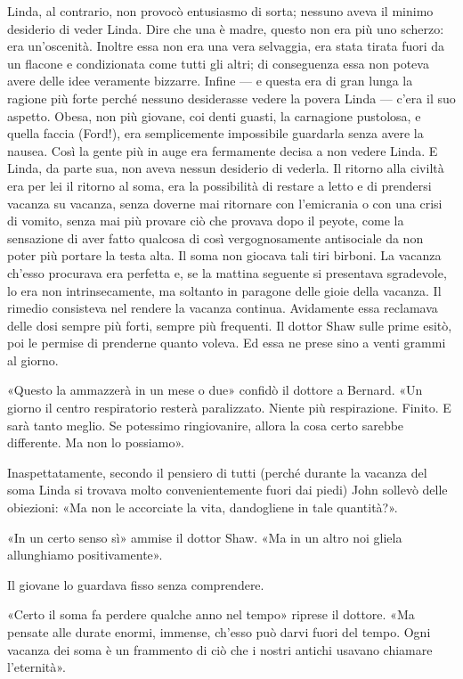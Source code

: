 \documentclass[
a5paper, %
10pt, %
twoside, 
onecolumn, %
openany, %
]{memoir}
\begin{document}
Linda, al contrario, non provocò entusiasmo di sorta; nessuno aveva il minimo desiderio di veder Linda. Dire che una è madre, questo non era più uno scherzo: era un’oscenità. Inoltre essa non era una vera selvaggia, era stata tirata fuori da un flacone e condizionata come tutti gli altri; di conseguenza essa non poteva avere delle idee veramente bizzarre. Infine — e questa era di gran lunga la ragione più forte perché nessuno desiderasse vedere la povera Linda — c’era il suo aspetto. Obesa, non più giovane, coi denti guasti, la carnagione pustolosa, e quella faccia (Ford!), era semplicemente impossibile guardarla senza avere la nausea. Così la gente più in auge era fermamente decisa a non vedere Linda. E Linda, da parte sua, non aveva nessun desiderio di vederla. Il ritorno alla civiltà era per lei il ritorno al soma, era la possibilità di restare a letto e di prendersi vacanza su vacanza, senza doverne mai ritornare con l’emicrania o con una crisi di vomito, senza mai più provare ciò che provava dopo il peyote, come la sensazione di aver fatto qualcosa di così vergognosamente antisociale da non poter più portare la testa alta. Il soma non giocava tali tiri birboni. La vacanza ch’esso procurava era perfetta e, se la mattina seguente si presentava sgradevole, lo era non intrinsecamente, ma soltanto in paragone delle gioie della vacanza. Il rimedio consisteva nel rendere la vacanza continua. Avidamente essa reclamava delle dosi sempre più forti, sempre più frequenti. Il dottor Shaw sulle prime esitò, poi le permise di prenderne quanto voleva. Ed essa ne prese sino a venti grammi al giorno.

«Questo la ammazzerà in un mese o due» confidò il dottore a Bernard. «Un giorno il centro respiratorio resterà paralizzato. Niente più respirazione. Finito. E sarà tanto meglio. Se potessimo ringiovanire, allora la cosa certo sarebbe differente. Ma non lo possiamo».

Inaspettatamente, secondo il pensiero di tutti (perché durante la vacanza del soma Linda si trovava molto convenientemente fuori dai piedi) John sollevò delle obiezioni: «Ma non le accorciate la vita, dandogliene in tale quantità?».

«In un certo senso sì» ammise il dottor Shaw. «Ma in un altro noi gliela allunghiamo positivamente».

Il giovane lo guardava fisso senza comprendere.

«Certo il soma fa perdere qualche anno nel tempo» riprese il dottore. «Ma pensate alle durate enormi, immense, ch’esso può darvi fuori del tempo. Ogni vacanza dei soma è un frammento di ciò che i nostri antichi usavano chiamare l’eternità».
\end{document}
